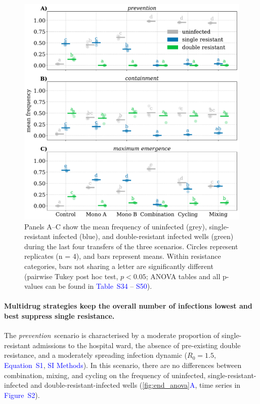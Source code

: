 \documentclass[9pt,twocolumn,twoside,lineno]{pnas-new}
\newcommand{\siref}[1]{\textcolor{blue}{S#1}}
\newcommand{\sifig}[1]{\textcolor{blue}{Figure~S#1}}
\newcommand{\sitab}[1]{\textcolor{blue}{Table~S#1}}
\newcommand{\sieq}[1]{\textcolor{blue}{Equation~S#1}}
\newcommand{\sisec}[1]{\textcolor{blue}{#1}}
\newcommand{\panelref}[2]{\autoref{#1}\textcolor{blue}{#2}}
\begin{document}
    
    \begin{figure}[h]
         \centering
         \includegraphics[width=\linewidth]{end_anova.pdf}
         \captionsetup{skip=2pt}
         \caption{
              Panels A--C show the mean frequency of uninfected (grey), single-resistant infected (blue), and double-resistant infected wells (green) during the last four transfers of the three scenarios.
              Circles represent replicates (n = 4), and bars represent means.
              Within resistance categories, bars not sharing a letter are significantly different (pairwise Tukey post hoc test, $p<0.05$; ANOVA tables and all p-values can be found in \sitab{34} -- \siref{50}).
          }
          \label{fig:end_anova}
    \end{figure}
    
    
    \paragraph{Multidrug strategies keep the overall number of infections lowest and best suppress single resistance.}
    The \textit{prevention}~scenario is characterised by a moderate proportion of single-resistant admissions to the hospital ward, the absence of pre-existing double resistance, and a moderately spreading infection dynamic ($R_0 = 1.5$, \sieq{1},  \sisec{SI Methods}).
    In this scenario, there are no differences between combination, mixing, and cycling on the frequency of uninfected, single-resistant-infected and double-resistant-infected wells (\panelref{fig:end_anova}{A}, time series in \sifig{2}).
    
\end{document}
